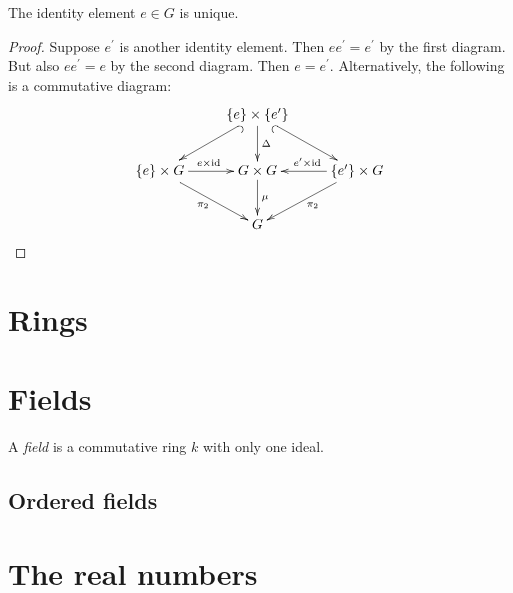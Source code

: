 \documentclass[11pt, norsk]{book}
\begin{document}
\begin{lemma}
The identity element $e \in G$ is unique.
\end{lemma}
\begin{proof}
Suppose $e^\prime$ is another identity element. Then $e e^\prime = e^\prime$ by the first diagram. But also $e e^\prime = e$ by the second diagram. Then $e=e^\prime$. Alternatively, the following is a commutative diagram:
\[
\xymatrix{
& \{e \} \times \{ e^\prime \} \ar@{^(->}[dl] \ar[d]^\Delta \ar@{_(->}[dr] & \\
\{ e\} \times G \ar[r]^{e \times \id} \ar[dr]_{\pi_2} & G \times G  \ar[d]^{\mu}& \{ e'\}  \times G  \ar[l]_{e^\prime \times \id} \ar[dl]^{\pi_2}\\
& G
} 
\]
\end{proof}

\chapter{Rings}

\chapter{Fields}

\begin{defi}
 A \emph{field} is a commutative ring $k$ with only one ideal.
\end{defi}

\section{Ordered fields}

\chapter{The real numbers}
\end{document}
